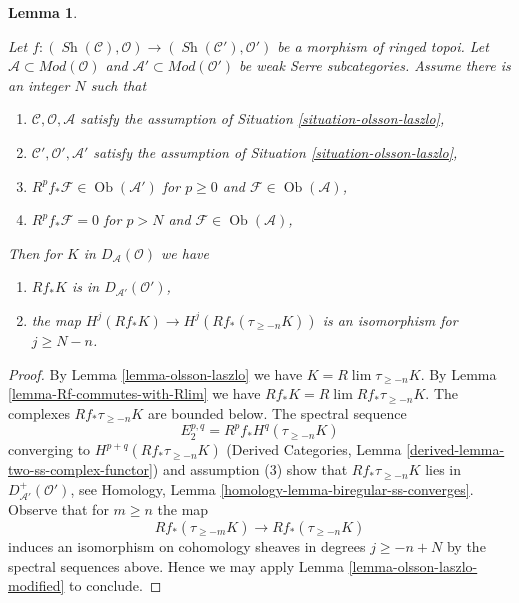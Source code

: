 \documentclass[10pt,a4paper]{amsart}
\theoremstyle{plain}
\newtheorem{lemma}[subsection]{Lemma}
\theoremstyle{definition}
\theoremstyle{remark}
\numberwithin{equation}{subsection}
\def\lim{\mathop{\mathrm{lim}}\nolimits}
\def\Ob{\mathop{\mathrm{Ob}}\nolimits}
\def\Sh{\mathop{\mathit{Sh}}\nolimits}
\begin{document}
\begin{lemma}
\label{lemma-olsson-laszlo-map-version-one}

Let $f : (\Sh(\mathcal{C}), \mathcal{O}) \to (\Sh(\mathcal{C}'), \mathcal{O}')$
be a morphism of ringed topoi.
Let $\mathcal{A} \subset \textit{Mod}(\mathcal{O})$
and $\mathcal{A}' \subset \textit{Mod}(\mathcal{O}')$
be weak Serre subcategories. Assume there is an integer $N$ such that
\begin{enumerate}
\item $\mathcal{C}, \mathcal{O}, \mathcal{A}$ satisfy the
assumption of Situation \ref{situation-olsson-laszlo},
\item $\mathcal{C}', \mathcal{O}', \mathcal{A}'$ satisfy the
assumption of Situation \ref{situation-olsson-laszlo},
\item $R^pf_*\mathcal{F} \in \Ob(\mathcal{A}')$ for
$p \geq 0$ and $\mathcal{F} \in \Ob(\mathcal{A})$,
\item $R^pf_*\mathcal{F} = 0$ for
$p > N$ and $\mathcal{F} \in \Ob(\mathcal{A})$,
\end{enumerate}
Then for $K$ in $D_\mathcal{A}(\mathcal{O})$ we have
\begin{enumerate}
\item[(a)] $Rf_*K$ is in $D_{\mathcal{A}'}(\mathcal{O}')$,
\item[(b)] the map
$H^j(Rf_*K) \to H^j(Rf_*(\tau_{\geq -n}K))$ is an isomorphism
for $j \geq N - n$.
\end{enumerate}
\end{lemma}

\begin{proof}
By Lemma \ref{lemma-olsson-laszlo} we have $K = R\lim \tau_{\geq -n}K$.
By Lemma \ref{lemma-Rf-commutes-with-Rlim}
we have $Rf_*K = R\lim Rf_*\tau_{\geq -n}K$.
The complexes $Rf_*\tau_{\geq -n}K$ are bounded below.
The spectral sequence
$$
E_2^{p, q} = R^pf_*H^q(\tau_{\geq -n}K)
$$
converging to $H^{p + q}(Rf_*\tau_{\geq -n}K)$
(Derived Categories, Lemma \ref{derived-lemma-two-ss-complex-functor})
and assumption (3)
show that $Rf_*\tau_{\geq -n}K$ lies in $D^+_{\mathcal{A}'}(\mathcal{O}')$,
see Homology, Lemma \ref{homology-lemma-biregular-ss-converges}.
Observe that for $m \geq n$ the map
$$
Rf_*(\tau_{\geq -m}K) \longrightarrow Rf_*(\tau_{\geq -n}K)
$$
induces an isomorphism on cohomology sheaves in degrees $j \geq -n + N$
by the spectral sequences above. Hence we may apply
Lemma \ref{lemma-olsson-laszlo-modified} to conclude.
\end{proof}
\end{document}
